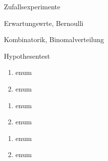 


\begin{inhalt}
	\item Zufallsexperimente
	\item Erwartungswrte, Bernoulli
	\item Kombinatorik, Binomalverteilung
	\item Hypothesentest
\end{inhalt}

\begin{enumerate}
	\item enum
	\item	enum
\end{enumerate}

\begin{enumerate}
	\item enum
	\item	enum
\end{enumerate}


\begin{enumerate}
	\item enum
	\item	enum
\end{enumerate}


